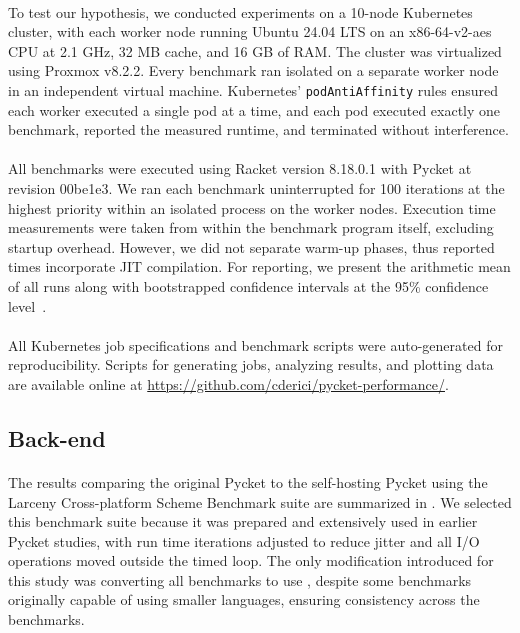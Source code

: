 			\paragraph{}%
				To test our hypothesis, we conducted experiments on a 10-node Kubernetes cluster, with each worker node running Ubuntu 24.04 LTS on an x86-64-v2-aes CPU at 2.1 GHz, 32 MB cache, and 16 GB of RAM. The cluster was virtualized using Proxmox v8.2.2. Every benchmark ran isolated on a separate worker node in an independent virtual machine. Kubernetes' \texttt{podAntiAffinity} rules ensured each worker executed a single pod at a time, and each pod executed exactly one benchmark, reported the measured runtime, and terminated without interference.

			\paragraph{}%
				All benchmarks were executed using Racket version 8.18.0.1 with Pycket at revision 00be1e3. We ran each benchmark uninterrupted for 100 iterations at the highest priority within an isolated process on the worker nodes. Execution time measurements were taken from within the benchmark program itself, excluding startup overhead. However, we did not separate warm-up phases, thus reported times incorporate JIT compilation. For reporting, we present the arithmetic mean of all runs along with bootstrapped confidence intervals at the 95\% confidence level~\cite{davisonBootstrapMethods2013}.

			\paragraph{}%
				All Kubernetes job specifications and benchmark scripts were auto-generated for reproducibility. Scripts for generating jobs, analyzing results, and plotting data are available online at \url{https://github.com/cderici/pycket-performance/}.

		\subsection{Back-end}


			\paragraph{}%
				The results comparing the original Pycket to the self-hosting Pycket using the Larceny Cross-platform Scheme Benchmark suite are summarized in . We selected this benchmark suite because it was prepared and extensively used in earlier Pycket studies, with run time iterations adjusted to reduce jitter and all I/O operations moved outside the timed loop. The only modification introduced for this study was converting all benchmarks to use , despite some benchmarks originally capable of using smaller languages, ensuring consistency across the benchmarks.

